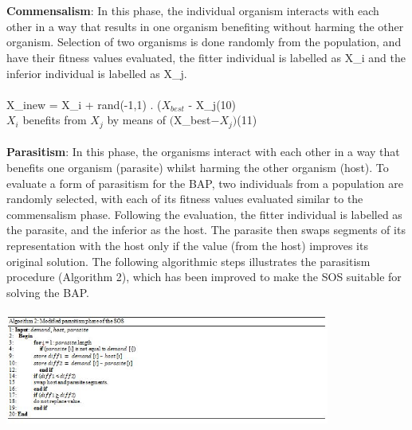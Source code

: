 \documentclass{article}
\newcommand\tab[1][1cm]{\hspace*{#1}}
\begin{document}
\\
\\
\textbf{Commensalism}: In this phase, the individual organism interacts with each other in a way that results in one organism benefiting without harming the other organism. Selection of two organisms is done randomly from the population, and have their fitness values evaluated, the fitter individual is labelled as X{_i} and the inferior individual is labelled as X{_j}.\\
\\
X{_{inew}} = X{_i} + rand(-1,1) . ($X{_{best}}$ - X{_j}\tab[10,7cm](10)\\
$X{_i}$ benefits from $X{_j}$ by means of $($X{_{best}}$ - X{_j})$\tab[9,5cm](11)\\
\\

\textbf{Parasitism}: In this phase, the organisms interact with each other in a way that benefits one organism (parasite) whilst harming the other organism (host). To evaluate a form of parasitism for the BAP, two individuals from a population are randomly selected, with each of its fitness values evaluated similar to the commensalism phase. Following the evaluation, the fitter individual is labelled as the parasite, and the inferior as the host. The parasite then swaps segments of its representation with the host only if the value (from the host) improves its original solution. The following algorithmic steps illustrates the parasitism procedure (Algorithm 2), which has been improved to make the SOS suitable for solving the BAP.\\
\\
\includegraphics[width=0.8\textwidth, center]{Images/alg2.JPG}
\\
\\
\end{document}
